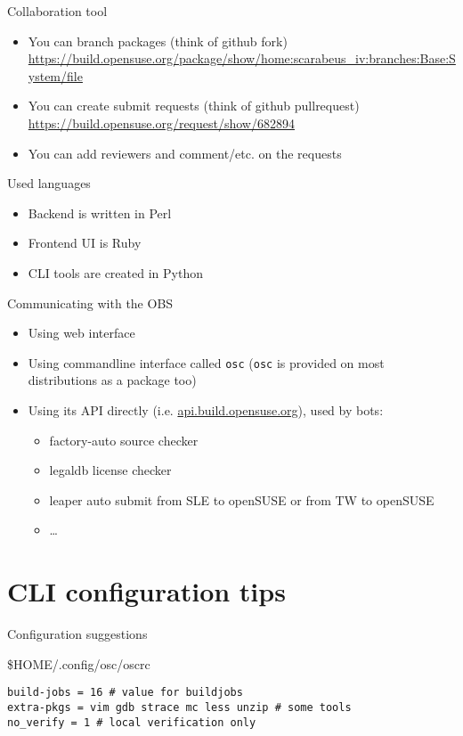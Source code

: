 \documentclass{beamer}
\begin{document}
\begin{frame}[t]{Collaboration tool}
    \begin{itemize}
      \item You can branch packages (think of github fork) \url{https://build.opensuse.org/package/show/home:scarabeus\_iv:branches:Base:System/file}
      \item You can create submit requests (think of github pullrequest) \url{https://build.opensuse.org/request/show/682894}
      \item You can add reviewers and comment/etc. on the requests
    \end{itemize}
\end{frame}

\begin{frame}[t]{Used languages}
  \begin{itemize}
     \item Backend is written in Perl
     \item Frontend UI is Ruby
     \item CLI tools are created in Python
  \end{itemize}
\end{frame}

\begin{frame}[t]{Communicating with the OBS}
    \begin{itemize}
    \item Using web interface
    \item Using commandline interface called \texttt{osc} (\texttt{osc} is provided on most distributions as a package too)
    \item Using its API directly (i.e. \url{api.build.opensuse.org}), used by bots:
    \begin{itemize}
    \item factory-auto source checker
    \item legaldb license checker
    \item leaper auto submit from SLE to openSUSE or from TW to openSUSE
    \item \ldots
    \end{itemize}
    \end{itemize}
\end{frame}

\section{CLI configuration tips}

\begin{frame}[fragile]{Configuration suggestions}
	\begin{center}\$HOME/.config/osc/oscrc\end{center}
	\begin{small}
\begin{verbatim}
build-jobs = 16 # value for buildjobs
extra-pkgs = vim gdb strace mc less unzip # some tools
no_verify = 1 # local verification only
\end{verbatim}
	\end{small}
\end{frame}
\end{document}
